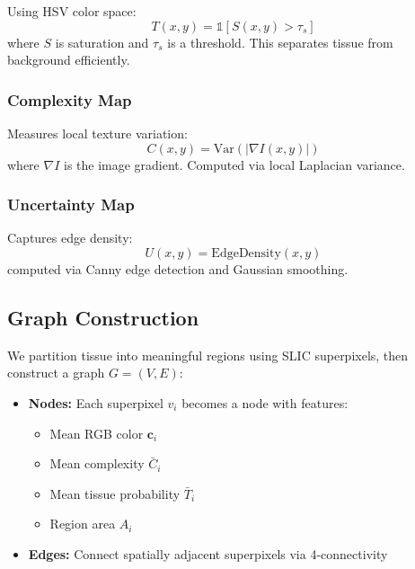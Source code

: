 \documentclass[runningheads]{llncs}
\begin{document}
Using HSV color space:
\begin{equation}
T(x, y) = \mathbb{1}[S(x, y) > \tau_s]
\end{equation}
where $S$ is saturation and $\tau_s$ is a threshold. This separates tissue from background efficiently.

\subsubsection{Complexity Map}

Measures local texture variation:
\begin{equation}
C(x, y) = \text{Var}(|\nabla I(x, y)|)
\end{equation}
where $\nabla I$ is the image gradient. Computed via local Laplacian variance.

\subsubsection{Uncertainty Map}

Captures edge density:
\begin{equation}
U(x, y) = \text{EdgeDensity}(x, y)
\end{equation}
computed via Canny edge detection and Gaussian smoothing.

\subsection{Graph Construction}

\label{sec:graph}

We partition tissue into meaningful regions using SLIC superpixels, then construct a graph $G = (V, E)$:

\begin{itemize}
\item \textbf{Nodes:} Each superpixel $v_i$ becomes a node with features:
  \begin{itemize}
    \item Mean RGB color $\mathbf{c}_i$
    \item Mean complexity $\bar{C}_i$
    \item Mean tissue probability $\bar{T}_i$
    \item Region area $A_i$
  \end{itemize}

\item \textbf{Edges:} Connect spatially adjacent superpixels via 4-connectivity
\end{itemize}
\end{document}
